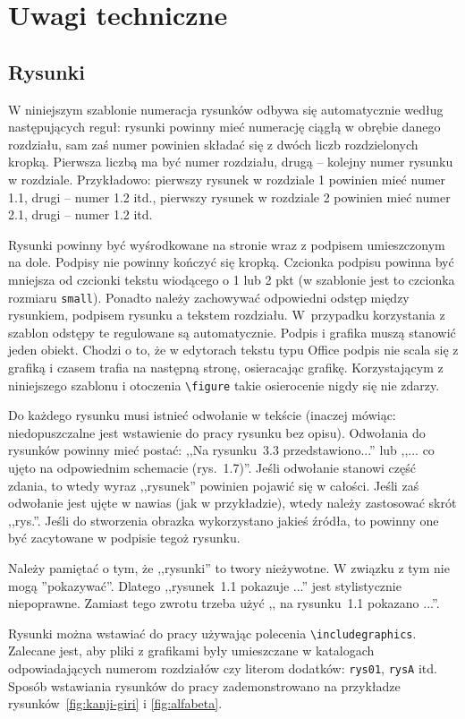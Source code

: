 \chapter{Uwagi techniczne}%
\section{Rysunki}
W niniejszym szablonie numeracja rysunków odbywa się automatycznie według następujących reguł: rysunki powinny mieć numerację ciągłą w obrębie danego rozdziału, sam zaś numer powinien składać się z dwóch liczb rozdzielonych kropką. Pierwsza liczbą ma być numer rozdziału, drugą -- kolejny numer rysunku w rozdziale. Przykładowo: pierwszy rysunek w rozdziale 1 powinien mieć numer 1.1, drugi -- numer 1.2 itd., pierwszy rysunek w rozdziale 2 powinien mieć numer 2.1, drugi -- numer 1.2 itd. 

Rysunki powinny być wyśrodkowane na stronie wraz z podpisem umieszczonym na dole. Podpisy nie powinny kończyć się kropką. Czcionka podpisu powinna być mniejsza od czcionki tekstu wiodącego o 1 lub 2 pkt (w szablonie jest to czcionka rozmiaru \texttt{small}). Ponadto należy zachowywać odpowiedni odstęp między rysunkiem, podpisem rysunku a tekstem rozdziału. 
W~przypadku korzystania z szablon odstępy te regulowane są automatycznie. Podpis i grafika muszą stanowić jeden obiekt. Chodzi o to, że w edytorach tekstu typu Office podpis nie scala się z grafiką i czasem trafia na następną stronę, osieracając grafikę. Korzystającym z niniejszego szablonu i otoczenia \verb?\figure? takie osierocenie nigdy się nie zdarzy.  

Do każdego rysunku musi istnieć odwołanie w tekście (inaczej mówiąc: niedopuszczalne jest wstawienie do pracy rysunku bez opisu). Odwołania do rysunków powinny mieć postać: ,,Na rysunku~3.3 przedstawiono...'' lub ,,... co ujęto na odpowiednim schemacie (rys.~1.7)''. 
Jeśli odwołanie stanowi część zdania, to wtedy wyraz ,,rysunek'' powinien pojawić się w całości. Jeśli zaś odwołanie jest ujęte w nawias (jak w przykładzie), wtedy należy zastosować skrót ,,rys.''. Jeśli do stworzenia obrazka wykorzystano jakieś źródła, to powinny one być zacytowane w podpisie tegoż rysunku. 

Należy pamiętać o tym, że ,,rysunki'' to twory nieżywotne. W związku z tym nie mogą ''pokazywać''. Dlatego ,,rysunek~1.1 pokazuje ...'' jest stylistycznie niepoprawne. Zamiast tego zwrotu trzeba użyć ,, na rysunku~1.1 pokazano ...''.

Rysunki można wstawiać do pracy używając polecenia \verb|\includegraphics|. Zalecane jest, aby pliki z grafikami były umieszczane w katalogach 
odpowiadających numerom rozdziałów czy literom dodatków: \verb|rys01|, \verb|rysA| itd. Sposób wstawiania rysunków do pracy zademonstrowano na przykładze rysunków~\ref{fig:kanji-giri} i \ref{fig:alfabeta}.

